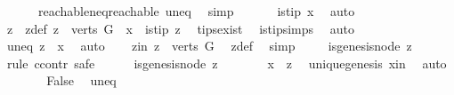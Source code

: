 \begin{isabellebody}
\ \ \ \ \ \ reachable{\isacharunderscore}{\kern0pt}neq{\isacharunderscore}{\kern0pt}reachable{}\ uneq\ \isamarkupfalse%
\ simp\isanewline
\ \ \isamarkupfalse%
\ \isamarkupfalse%
\ {\isachardoublequoteopen}{\isasymnot}\ is{\isacharunderscore}{\kern0pt}tip\ x{\isachardoublequoteclose}\ \isamarkupfalse%
\ auto\isanewline
\ \ \isamarkupfalse%
\ \isamarkupfalse%
\ z\ \ z{\isacharunderscore}{\kern0pt}def{\isacharcolon}{\kern0pt}\ {\isachardoublequoteopen}z\ {\isasymin}\ {\isacharparenleft}{\kern0pt}verts\ G{\isacharparenright}{\kern0pt}\ {\isacharminus}{\kern0pt}\ {\isacharbraceleft}{\kern0pt}x{\isacharbraceright}{\kern0pt}\ {\isasymand}\ is{\isacharunderscore}{\kern0pt}tip\ z{\isachardoublequoteclose}\ \isamarkupfalse%
\ tips{\isacharunderscore}{\kern0pt}exist\isanewline
\ \ is{\isacharunderscore}{\kern0pt}tip{\isachardot}{\kern0pt}simps\ \isamarkupfalse%
\ auto\isanewline
\ \ \isamarkupfalse%
\ \isamarkupfalse%
\ uneq{\isacharcolon}{\kern0pt}\ {\isachardoublequoteopen}z\ {\isasymnoteq}\ x{\isachardoublequoteclose}\ \isamarkupfalse%
\ auto\isanewline
\ \ \isamarkupfalse%
\ z{\isacharunderscore}{\kern0pt}in{\isacharcolon}{\kern0pt}\ {\isachardoublequoteopen}z\ {\isasymin}\ verts\ G{\isachardoublequoteclose}\ \isamarkupfalse%
\ z{\isacharunderscore}{\kern0pt}def\ \isamarkupfalse%
\ simp\isanewline
\ \ \isamarkupfalse%
\ {\isachardoublequoteopen}{\isasymnot}\ is{\isacharunderscore}{\kern0pt}genesis{\isacharunderscore}{\kern0pt}node\ z{\isachardoublequoteclose}\isanewline
\ \ \isamarkupfalse%
\ {\isacharparenleft}{\kern0pt}rule\ ccontr{\isacharcomma}{\kern0pt}\ safe{\isacharparenright}{\kern0pt}\isanewline
\ \ \ \ \isamarkupfalse%
\ {\isachardoublequoteopen}is{\isacharunderscore}{\kern0pt}genesis{\isacharunderscore}{\kern0pt}node\ z{\isachardoublequoteclose}\isanewline
\ \ \ \ \isamarkupfalse%
\ \isamarkupfalse%
\ {\isachardoublequoteopen}x\ {\isacharequal}{\kern0pt}\ z{\isachardoublequoteclose}\ \isamarkupfalse%
\ unique{\isacharunderscore}{\kern0pt}genesis\ x{\isacharunderscore}{\kern0pt}in\ \isamarkupfalse%
\ auto\isanewline
\ \ \ \ \isamarkupfalse%
\ \isamarkupfalse%
\ False\ \isamarkupfalse%
\ uneq\ \isamarkupfalse%

\end{isabellebody}
